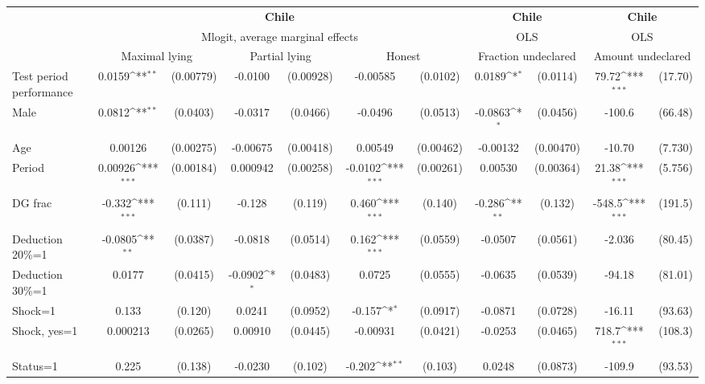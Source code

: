 \def\sym#1{\ifmmode^{#1}\else\(^{#1}\)\fi}
\begin{tabular}{l|cccccc|cc|cc}
\hline\hline
&\multicolumn{6}{c|}{\bf Chile}&\multicolumn{2}{c|}{\bf Chile}&\multicolumn{2}{c}{\bf Chile}\\ &\multicolumn{6}{c|}{Mlogit, average marginal effects }&\multicolumn{2}{c|}{OLS}&\multicolumn{2}{c}{OLS}\\
                &\multicolumn{2}{c}{Maximal lying}&\multicolumn{2}{c}{Partial lying}&\multicolumn{2}{c}{Honest}  &\multicolumn{2}{c}{Fraction undeclared}&\multicolumn{2}{c}{Amount undeclared}\\
\hline
Test period performance&   0.0159\sym{**} &(0.00779)&  -0.0100         &(0.00928)& -0.00585         & (0.0102)&   0.0189\sym{*}  & (0.0114)&    79.72\sym{***}&  (17.70)\\
Male            &   0.0812\sym{**} & (0.0403)&  -0.0317         & (0.0466)&  -0.0496         & (0.0513)&  -0.0863\sym{*}  & (0.0456)&   -100.6         &  (66.48)\\
Age             &  0.00126         &(0.00275)& -0.00675         &(0.00418)&  0.00549         &(0.00462)& -0.00132         &(0.00470)&   -10.70         &  (7.730)\\
Period          &  0.00926\sym{***}&(0.00184)& 0.000942         &(0.00258)&  -0.0102\sym{***}&(0.00261)&  0.00530         &(0.00364)&    21.38\sym{***}&  (5.756)\\
DG frac         &   -0.332\sym{***}&  (0.111)&   -0.128         &  (0.119)&    0.460\sym{***}&  (0.140)&   -0.286\sym{**} &  (0.132)&   -548.5\sym{***}&  (191.5)\\
Deduction 20\%=1&  -0.0805\sym{**} & (0.0387)&  -0.0818         & (0.0514)&    0.162\sym{***}& (0.0559)&  -0.0507         & (0.0561)&   -2.036         &  (80.45)\\
Deduction 30\%=1&   0.0177         & (0.0415)&  -0.0902\sym{*}  & (0.0483)&   0.0725         & (0.0555)&  -0.0635         & (0.0539)&   -94.18         &  (81.01)\\
Shock=1         &    0.133         &  (0.120)&   0.0241         & (0.0952)&   -0.157\sym{*}  & (0.0917)&  -0.0871         & (0.0728)&   -16.11         &  (93.63)\\
Shock, yes=1    & 0.000213         & (0.0265)&  0.00910         & (0.0445)& -0.00931         & (0.0421)&  -0.0253         & (0.0465)&    718.7\sym{***}&  (108.3)\\
Status=1        &    0.225         &  (0.138)&  -0.0230         &  (0.102)&   -0.202\sym{**} &  (0.103)&   0.0248         & (0.0873)&   -109.9         &  (93.53)\\

\end{tabular}
